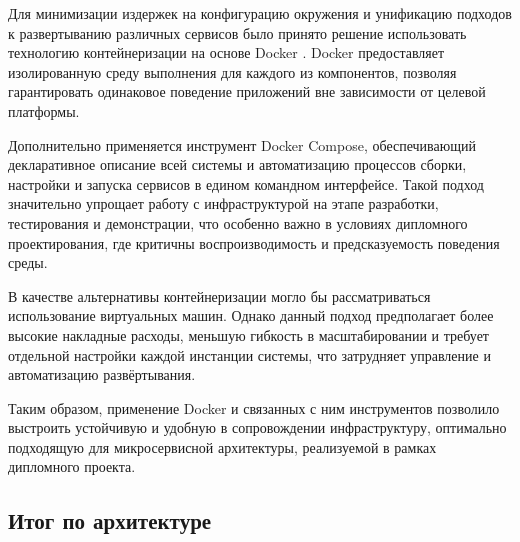 Для минимизации издержек на конфигурацию окружения и унификацию подходов
к развертыванию различных сервисов было принято решение
использовать технологию контейнеризации на основе Docker \cite{Docker}.
Docker предоставляет изолированную среду выполнения
для каждого из компонентов, позволяя гарантировать
одинаковое поведение приложений вне зависимости от целевой платформы.

Дополнительно применяется инструмент Docker Compose,
обеспечивающий декларативное описание всей системы
и автоматизацию процессов сборки, настройки и запуска сервисов
в едином командном интерфейсе.
Такой подход значительно упрощает работу с инфраструктурой
на этапе разработки, тестирования и демонстрации,
что особенно важно в условиях дипломного проектирования,
где критичны воспроизводимость и предсказуемость поведения среды.

В качестве альтернативы контейнеризации
могло бы рассматриваться использование виртуальных машин.
Однако данный подход предполагает более высокие накладные расходы,
меньшую гибкость в масштабировании
и требует отдельной настройки каждой инстанции системы,
что затрудняет управление и автоматизацию развёртывания.

Таким образом, применение Docker и связанных с ним инструментов
позволило выстроить устойчивую и удобную в сопровождении инфраструктуру,
оптимально подходящую для микросервисной архитектуры,
реализуемой в рамках дипломного проекта.

\subsection{Итог по архитектуре}

\begin{table}[h!]
\centering
{}
\caption{Архитектурные решения и обоснование выбора}
\end{table}


